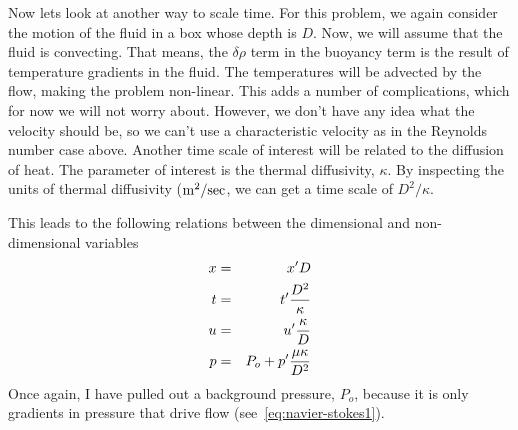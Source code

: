 \documentclass[12pt,twoside]{article}
\begin{document}
Now lets look at another way to scale time.   For this problem, we again
consider the motion of the fluid in a box whose depth is $D$.  Now, we
will assume that the fluid is convecting.  That means, the $\delta \rho$ term
in the buoyancy term is the result of temperature gradients in the fluid.  The
temperatures will be advected by the flow, making  the problem non-linear. 
This adds a number of complications, which for now we will not worry about. 
However, we don't have any idea what the velocity should be, so we can't use a
characteristic velocity as in the Reynolds number case above.  Another time
scale of interest will be related to the diffusion of heat. The parameter of
interest is the thermal diffusivity, $\kappa$.  By inspecting the units of
thermal diffusivity (${\rm m^2 / sec}$, we can get a time scale of $D^2/\kappa$.

This leads to the following relations between the dimensional and
non-dimensional variables
\begin{eqnarray} 
x & = & x^\prime D \\ 
t & = & t^\prime {D^2 \over \kappa} \\ 
u & = & u^\prime {\kappa \over D} \\ 
p & = & P_o + p^\prime {{\mu \kappa}\over D^2}
\end{eqnarray} 
Once again, I have pulled out a background pressure, $P_o$, because it
is only gradients in pressure that drive flow (see~\ref{eq:navier-stokes1}).  
 
\end{document}
